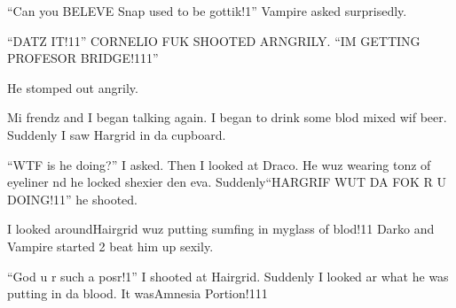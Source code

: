 \enquote{Can you BELEVE Snap used to be gottik!1} Vampire asked surprisedly.

\enquote{DATZ IT!11} CORNELIO FUK SHOOTED ARNGRILY\@. \enquote{IM GETTING PROFESOR BRIDGE!111}

He stomped out angrily.

Mi frendz and I began talking again. I began to drink some blod mixed wif beer. Suddenly I saw Hargrid in da cupboard.

\enquote{WTF is he doing?} I asked. Then I looked at Draco. He wuz wearing tonz of eyeliner nd he locked shexier den eva. Suddenly\dotfill\enquote{HARGRIF WUT DA FOK R U DOING!11}\newline
he shooted.

I looked around\dotfill Hairgrid wuz putting sumfing in my\newline glass of blod!11 Darko and Vampire started 2 beat him up sexily.

\enquote{God u r such a posr!1} I shooted at Hairgrid. Suddenly I looked ar what he was putting in da blood. It was\dotfill\newline Amnesia Portion!111

